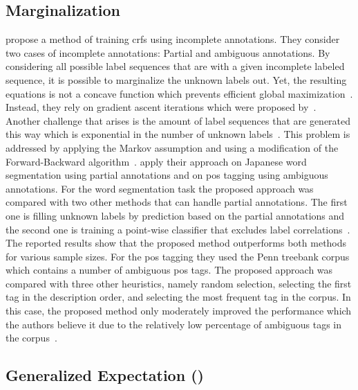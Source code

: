 \subsection{Marginalization}
\citet{tsuboi2008training} propose a method of training \glspl{crf} using incomplete annotations.
They consider two cases of incomplete annotations: Partial and ambiguous annotations.
By considering all possible label sequences that are with a given incomplete labeled sequence, it is possible to marginalize the unknown labels out.
Yet, the resulting equations is not a concave function which prevents efficient global maximization~\citep{tsuboi2008training}.
Instead, they rely on gradient ascent iterations which were proposed by~\citep{sha2003shallow}.
Another challenge that arises is the amount of label sequences that are generated this way which is exponential in the number of unknown labels~\citep{tsuboi2008training}.
This problem is addressed by applying the Markov assumption and using a modification of the Forward-Backward algorithm~\citep{tsuboi2008training}.
\citet{tsuboi2008training} apply their approach on Japanese word segmentation using partial annotations and on \gls{pos} tagging using ambiguous annotations.
For the word segmentation task the proposed approach was compared with two other methods that can handle partial annotations.
The first one is filling unknown labels by prediction based on the partial annotations and the second one is training a point-wise classifier that excludes label correlations~\citep{tsuboi2008training}.
The reported results show that the proposed method outperforms both methods for various sample sizes.
For the \gls{pos} tagging they used the Penn treebank corpus \citep{marcus1993building} which contains a number of ambiguous \gls{pos} tags.
The proposed approach was compared with three other heuristics, namely random selection, selecting the first tag in the description order, and selecting the most frequent tag in the corpus.
In this case, the proposed method only moderately improved the performance which the authors believe it due to the relatively low percentage of ambiguous tags in the corpus~\citep{tsuboi2008training}.

\subsection{Generalized Expectation ()}

